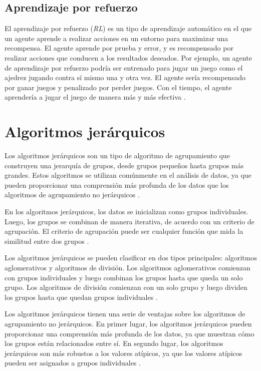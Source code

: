 \subsection{Aprendizaje por refuerzo}
El aprendizaje por refuerzo (\textit{RL}) es un tipo de aprendizaje automático en el que un agente aprende a realizar acciones en un entorno para maximizar una recompensa. El agente aprende por prueba y error, y es recompensado por realizar acciones que conducen a los resultados deseados. Por ejemplo, un agente de aprendizaje por refuerzo podría ser entrenado para jugar un juego como el ajedrez jugando contra sí mismo una y otra vez. El agente sería recompensado por ganar juegos y penalizado por perder juegos. Con el tiempo, el agente aprendería a jugar el juego de manera más y más efectiva \cite{G-Cloud_2023}.

\section{Algoritmos jerárquicos}

Los algoritmos jerárquicos son un tipo de algoritmo de agrupamiento que construyen una jerarquía de grupos, desde grupos pequeños hasta grupos más grandes. Estos algoritmos se utilizan comúnmente en el análisis de datos, ya que pueden proporcionar una comprensión más profunda de los datos que los algoritmos de agrupamiento no jerárquicos \cite{pascual2007algoritmos}.

En los algoritmos jerárquicos, los datos se inicializan como grupos individuales. Luego, los grupos se combinan de manera iterativa, de acuerdo con un criterio de agrupación. El criterio de agrupación puede ser cualquier función que mida la similitud entre dos grupos \cite{pascual2007algoritmos}.

Los algoritmos jerárquicos se pueden clasificar en dos tipos principales: algoritmos aglomerativos y algoritmos de división. Los algoritmos aglomerativos comienzan con grupos individuales y luego combinan los grupos hasta que queda un solo grupo. Los algoritmos de división comienzan con un solo grupo y luego dividen los grupos hasta que quedan grupos individuales \cite{gonzalez2010algoritmos}.

Los algoritmos jerárquicos tienen una serie de ventajas sobre los algoritmos de agrupamiento no jerárquicos. En primer lugar, los algoritmos jerárquicos pueden proporcionar una comprensión más profunda de los datos, ya que muestran cómo los grupos están relacionados entre sí. En segundo lugar, los algoritmos jerárquicos son más robustos a los valores atípicos, ya que los valores atípicos pueden ser asignados a grupos individuales \cite{gonzalez2010algoritmos}.

